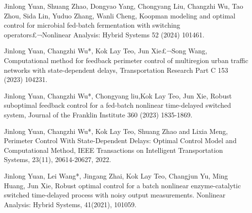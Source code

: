 \documentclass[12pt]{llncs}
\begin{document}
%



\begin{thebibliography}{9} %

 Jinlong Yuan, Shuang Zhao, Dongyao Yang, Chongyang Liu, Changzhi Wu, Tao Zhou, Sida Lin, Yuduo Zhang, Wanli Cheng, Koopman modeling and optimal control for microbial fed-batch fermentation with switching operators£¬Nonlinear Analysis: Hybrid Systems 52 (2024) 101461.

 Jinlong Yuan, Changzhi Wu*, Kok Lay Teo, Jun Xie£¬Song Wang, Computational method for feedback perimeter control of multiregion urban traffic networks with state-dependent delays, Transportation Research Part C 153 (2023) 104231.

 Jinlong Yuan, Changzhi Wu*, Chongyang liu,Kok Lay Teo, Jun Xie, Robust suboptimal feedback control for a fed-batch nonlinear time-delayed switched system, Journal of the Franklin Institute 360 (2023) 1835-1869.

 Jinlong Yuan, Changzhi Wu*, Kok Lay Teo, Shuang Zhao and Lixia Meng, Perimeter Control With State-Dependent Delays: Optimal Control Model and Computational Method, IEEE Transactions on Intelligent Transportation Systems, 23(11), 20614-20627, 2022.

 Jinlong Yuan, Lei Wang*, Jingang Zhai, Kok Lay Teo, Changjun Yu, Ming Huang, Jun Xie, Robust optimal control for a batch nonlinear enzyme-catalytic switched time-delayed process with noisy output measurements. Nonlinear Analysis: Hybrid Systems, 41(2021), 101059.

\end{thebibliography}
\end{document}
